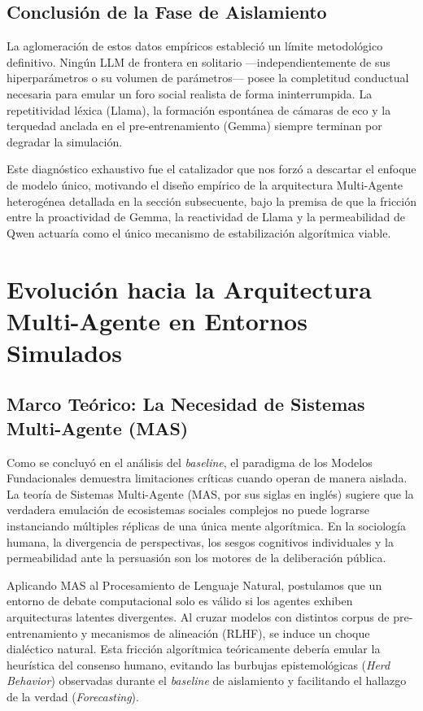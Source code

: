 \documentclass{article}
\begin{document}
\subsection{Conclusión de la Fase de Aislamiento}

La aglomeración de estos datos empíricos estableció un límite metodológico definitivo. Ningún LLM de frontera en solitario —independientemente de sus hiperparámetros o su volumen de parámetros— posee la completitud conductual necesaria para emular un foro social realista de forma ininterrumpida. La repetitividad léxica (Llama), la formación espontánea de cámaras de eco y la terquedad anclada en el pre-entrenamiento (Gemma) siempre terminan por degradar la simulación. 

Este diagnóstico exhaustivo fue el catalizador que nos forzó a descartar el enfoque de modelo único, motivando el diseño empírico de la arquitectura Multi-Agente heterogénea detallada en la sección subsecuente, bajo la premisa de que la fricción entre la proactividad de Gemma, la reactividad de Llama y la permeabilidad de Qwen actuaría como el único mecanismo de estabilización algorítmica viable.



\section{Evolución hacia la Arquitectura Multi-Agente en Entornos Simulados}

\subsection{Marco Teórico: La Necesidad de Sistemas Multi-Agente (MAS)}

Como se concluyó en el análisis del \textit{baseline}, el paradigma de los Modelos Fundacionales demuestra limitaciones críticas cuando operan de manera aislada. La teoría de Sistemas Multi-Agente (MAS, por sus siglas en inglés) sugiere que la verdadera emulación de ecosistemas sociales complejos no puede lograrse instanciando múltiples réplicas de una única mente algorítmica. En la sociología humana, la divergencia de perspectivas, los sesgos cognitivos individuales y la permeabilidad ante la persuasión son los motores de la deliberación pública. 

Aplicando MAS al Procesamiento de Lenguaje Natural, postulamos que un entorno de debate computacional solo es válido si los agentes exhiben arquitecturas latentes divergentes. Al cruzar modelos con distintos corpus de pre-entrenamiento y mecanismos de alineación (RLHF), se induce un choque dialéctico natural. Esta fricción algorítmica teóricamente debería emular la heurística del consenso humano, evitando las burbujas epistemológicas (\textit{Herd Behavior}) observadas durante el \textit{baseline} de aislamiento y facilitando el hallazgo de la verdad (\textit{Forecasting}).
\end{document}
